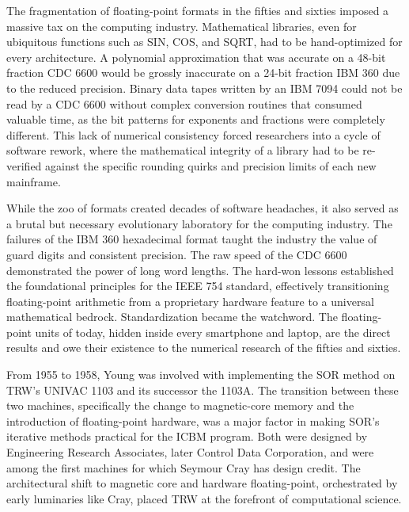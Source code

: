 The fragmentation of floating-point formats in the fifties and sixties imposed a massive tax on the computing industry. Mathematical libraries, even for ubiquitous functions such as SIN, COS, and SQRT, had to be hand-optimized for every architecture. A polynomial approximation that was accurate on a 48-bit fraction CDC 6600 would be grossly inaccurate on a 24-bit fraction IBM 360 due to the reduced precision. Binary data tapes written by an IBM 7094 could not be read by a CDC 6600 without complex conversion routines that consumed valuable time, as the bit patterns for exponents and fractions were completely different. This lack of numerical consistency forced researchers into a cycle of software rework, where the mathematical integrity of a library had to be re-verified against the specific rounding quirks and precision limits of each new mainframe. 

While the zoo of formats created decades of software headaches, it also served as a brutal but necessary evolutionary laboratory for the computing industry. The failures of the IBM 360 hexadecimal format taught the industry the value of guard digits and consistent precision. The raw speed of the CDC 6600 demonstrated the power of long word lengths. The hard-won lessons established the foundational principles for the IEEE 754 standard, effectively transitioning floating-point arithmetic from a proprietary hardware feature to a universal mathematical bedrock. Standardization became the watchword. The floating-point units of today, hidden inside every smartphone and laptop, are the direct results and owe their existence to the numerical research of the fifties and sixties. 

From 1955 to 1958, Young was involved with implementing the SOR method on TRW’s UNIVAC 1103 and its successor the 1103A. The transition between these two machines, specifically the change to magnetic-core memory and the introduction of floating-point hardware, was a major factor in making SOR's iterative methods practical for the ICBM program. Both were designed by Engineering Research Associates, later Control Data Corporation, and were among the first machines for which Seymour Cray has design credit. The architectural shift to magnetic core and hardware floating-point, orchestrated by early luminaries like Cray, placed TRW at the forefront of computational science. 

